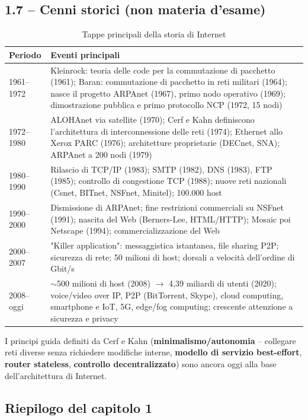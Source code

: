 \documentclass[12pt, a4paper]{article}
\begin{document}
\subsection{1.7 -- Cenni storici (non materia d'esame)}

\begin{table}[H]
\centering
\caption{Tappe principali della storia di Internet}
\small
\begin{tabular}{p{2.5cm}p{11cm}}
\toprule
\textbf{Periodo} & \textbf{Eventi principali} \\
\midrule
1961--1972 & Kleinrock: teoria delle code per la commutazione di pacchetto (1961); Baran: commutazione di pacchetto in reti militari (1964); nasce il progetto ARPAnet (1967), primo nodo operativo (1969); dimostrazione pubblica e primo protocollo NCP (1972, 15 nodi) \\
1972--1980 & ALOHAnet via satellite (1970); Cerf e Kahn definiscono l'architettura di interconnessione delle reti (1974); Ethernet allo Xerox PARC (1976); architetture proprietarie (DECnet, SNA); ARPAnet a 200 nodi (1979) \\
1980--1990 & Rilascio di TCP/IP (1983); SMTP (1982), DNS (1983), FTP (1985); controllo di congestione TCP (1988); nuove reti nazionali (Csnet, BITnet, NSFnet, Minitel); 100.000 host \\
1990--2000 & Dismissione di ARPAnet; fine restrizioni commerciali su NSFnet (1991); nascita del Web (Berners-Lee, HTML/HTTP); Mosaic poi Netscape (1994); commercializzazione del Web \\
2000--2007 & "Killer application": messaggistica istantanea, file sharing P2P; sicurezza di rete; 50 milioni di host; dorsali a velocità dell'ordine di Gbit/s \\
2008--oggi & $\sim$500 milioni di host (2008) $\to$ 4,39 miliardi di utenti (2020); voice/video over IP, P2P (BitTorrent, Skype), cloud computing, smartphone e IoT, 5G, edge/fog computing; crescente attenzione a sicurezza e privacy \\
\bottomrule
\end{tabular}
\end{table}

I principi guida definiti da Cerf e Kahn (\textbf{minimalismo/autonomia} -- collegare reti diverse senza richiedere modifiche interne, \textbf{modello di servizio best-effort}, \textbf{router stateless}, \textbf{controllo decentralizzato}) sono ancora oggi alla base dell'architettura di Internet.

\subsection{Riepilogo del capitolo 1}
\end{document}
